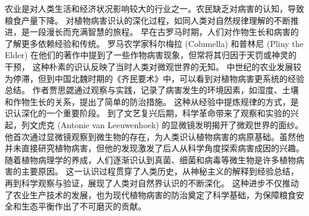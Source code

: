 \documentclass[AutoFakeBold]{LZUThesis-PgD&PhD}
\begin{document}
	农业是对人类生活和经济状况影响较大的行业之一。农民缺乏对病害的认知，导致粮食产量下降\cite{plantleaf_disease_dl}。
	对植物病害识认的深化过程，如同人类对自然规律理解的不断推进，是一段漫长而充满智慧的旅程。
	早在古罗马时期，人们对作物生长和病害的了解更多依赖经验和传统。
	罗马农学家科尔梅拉 (Columella) 和普林尼 (Pliny the Elder) 在他们的著作中提到了一些作物病害现象，但常将其归因于天罚或神灵的干预，
	这种朴素的识认反映了当时人类对微观世界的无知\cite{columella1941agriculture}。
	中世纪的农业发展较为停滞，但到中国北魏时期的《齐民要术》中，可以看到对植物病害更系统的经验总结。
	作者贾思勰通过观察与实践，记录了病害发生的环境因素，如湿度、土壤和作物生长的关系，提出了简单的防治措施\cite{jia535qimin}。
	这种从经验中提炼规律的方式，是识认深化的一个重要阶段。
	到了文艺复兴后期，科学革命带来了观察和实验的兴起，列文虎克 (Antonie van Leeuwenhoek) 的显微镜发明揭开了微观世界的面纱。
	他首次通过显微镜观察到微生物的存在，为人类识认植物病害的病原基础。虽然他并未直接研究植物病害，但他的发现激发了后人从科学角度探索病害成因的兴趣\cite{leeuwenhoek1683observations}。
	随着植物病理学的养成，人们逐渐识认到真菌、细菌和病毒等微生物是许多植物病害的主要原因\cite{agrios2005plant}。
	这一认识过程贯穿了人类历史，从神秘主义的解释到经验总结，再到科学观察与验证，展现了人类对自然界认识的不断深化。
	这种进步不仅推动了农业生产技术的发展，也为现代植物病害的防治奠定了科学基础，为保障粮食安全和生态平衡作出了不可磨灭的贡献。
\end{document}
